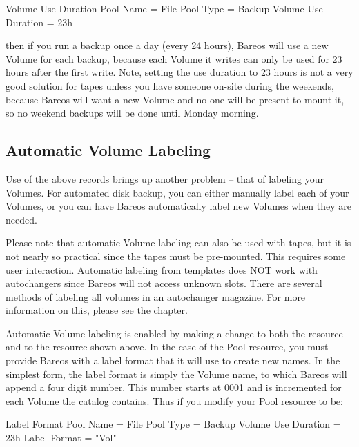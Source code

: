 \begin{bconfig}{Volume Use Duration}
Pool {
  Name = File
  Pool Type = Backup
  Volume Use Duration = 23h
}
\end{bconfig}

then if you run a backup once a day (every 24 hours), Bareos will use a new
Volume for each backup, because each Volume it writes can only be used for 23 hours
after the first write. Note, setting the use duration to 23 hours is not a very
good solution for tapes unless you have someone on-site during the weekends,
because Bareos will want a new Volume and no one will be present to mount it,
so no weekend backups will be done until Monday morning.

\subsection{Automatic Volume Labeling}
\label{AutomaticLabeling}

Use of the above records brings up another problem -- that of labeling your
Volumes. For automated disk backup, you can either manually label each of your
Volumes, or you can have Bareos automatically label new Volumes when they are
needed.

Please note that automatic Volume labeling can also be used with tapes, but
it is not nearly so practical since the tapes must be pre-mounted.  This
requires some user interaction.  Automatic labeling from templates does NOT
work with autochangers since Bareos will not access unknown slots.  There
are several methods of labeling all volumes in an autochanger magazine.
For more information on this, please see the  chapter.

Automatic Volume labeling is enabled by making a change to both the 
resource and to the  resource shown above.
In the case of the Pool resource, you must provide Bareos with a label format
that it will use to create new names. In the simplest form, the label format
is simply the Volume name, to which Bareos will append a four digit number.
This number starts at 0001 and is incremented for each Volume the catalog
contains. Thus if you modify your Pool resource to be:

\begin{bconfig}{Label Format}
Pool {
  Name = File
  Pool Type = Backup
  Volume Use Duration = 23h
  Label Format = "Vol"
}
\end{bconfig}

